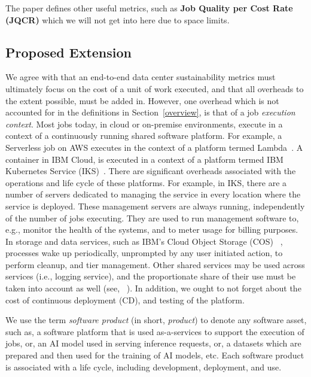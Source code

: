 {{        The paper defines other useful metrics, such as {\bf Job Quality per Cost Rate (JQCR)} which we will not get into here due to space limits.
    }

    \subsection{Proposed Extension}
    {
        \label{extensions}

        We agree with \cite{Gandhi2022} that an end-to-end data center sustainability metrics must ultimately focus on the cost of a unit of work executed, and that all overheads to the extent possible, must be added in. However, one overhead which is not accounted for in the definitions in Section~\ref{overview}, is that of a job \textit{execution context}. Most jobs today, in cloud or on-premise environments, execute in a context of a continuously running shared software platform. For example, a Serverless job on AWS executes in the context of a platform termed Lambda~\cite{Lambda}. A container in IBM Cloud, is executed in a context of a platform termed IBM Kubernetes Service (IKS)~\cite{IKS}. There are significant overheads associated with the operations and life cycle of these platforms. For example, in IKS, there are a number of servers dedicated to managing the service in every location where the service is deployed. These management servers are always running, independently of the number of jobs executing. They are used to run management software to, e.g., monitor the health of the systems, and to meter usage for billing purposes. In storage and data services, such as IBM's Cloud Object Storage (COS) ~\cite{COS}, processes wake up periodically, unprompted by any user initiated action, to perform cleanup, and tier management. Other shared services may be used across services (i.e., logging service), and the proportionate share of their use must be taken into account as well (see, ~\cite{Eilam2021}). In addition, we ought to not forget about the cost of continuous deployment (CD), and testing of the platform.

        We use the term \textit{software product} (in short, \textit{product}) to denote any software asset, such as, a software platform that is used as-a-services to support the execution of jobs, or, an AI model used in serving inference requests, or, a datasets which are prepared and then used for the training of AI models, etc. Each software product is associated with a life cycle, including development, deployment, and use.

}}
